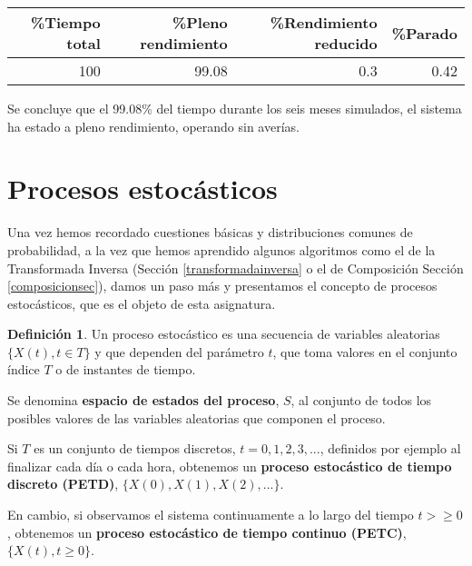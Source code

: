 \documentclass[
]{book}
\newenvironment{yellowbox}{
  \definecolor{shadecolor}{rgb}{210, 180, 140}  
  \color{black}
  \begin{shaded}}
 {\end{shaded}}
\theoremstyle{definition}
\newtheorem{definition}{Definición}[chapter]
\theoremstyle{definition}
\theoremstyle{definition}
\theoremstyle{definition}
\theoremstyle{remark}
\begin{document}
\begin{table}
\centering
\begin{tabular}[t]{r|r|r|r}
\hline
\%Tiempo total & \%Pleno rendimiento & \%Rendimiento reducido & \%Parado\\
\hline
100 & 99.08 & 0.3 & 0.42\\
\hline
\end{tabular}
\end{table}

Se concluye que el 99.08\% del tiempo durante los seis meses simulados, el sistema ha estado a pleno rendimiento, operando sin averías.

\hypertarget{ProEstoc}{%
\section{Procesos estocásticos}\label{ProEstoc}}

Una vez hemos recordado cuestiones básicas y distribuciones comunes de probabilidad, a la vez que hemos aprendido algunos algoritmos como el de la Transformada Inversa (Sección \ref{transformadainversa} o el de Composición Sección \ref{composicionsec}), damos un paso más y presentamos el concepto de procesos estocásticos, que es el objeto de esta asignatura.

\begin{yellowbox}

\begin{definition}
\protect\hypertarget{def:procesoestocastico}{}\label{def:procesoestocastico}Un proceso estocástico es una secuencia de variables aleatorias \(\{X(t), t \in T\}\) y que dependen del parámetro \(t\), que toma valores en el conjunto índice \(T\) o de instantes de tiempo.

Se denomina \textbf{espacio de estados del proceso}, \(S\), al conjunto de todos los posibles valores de las variables aleatorias que componen el proceso.
\end{definition}

\end{yellowbox}

Si \(T\) es un conjunto de tiempos discretos, \(t = 0, 1, 2, 3,...\), definidos por ejemplo al finalizar cada día o cada hora, obtenemos un \textbf{proceso estocástico de tiempo discreto (PETD)}, \(\{X(0), X(1), X(2),...\}\).

En cambio, si observamos el sistema continuamente a lo largo del tiempo \(t>\geq 0\), obtenemos un \textbf{proceso estocástico de tiempo continuo (PETC)}, \(\{X(t), t \geq 0\}\).
\end{document}
